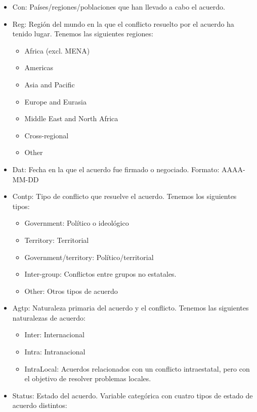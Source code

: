 \documentclass[11pt]{article}
\providecommand{\tightlist}{%
      \setlength{\itemsep}{0pt}\setlength{\parskip}{0pt}}
\begin{document}
\begin{itemize}
\tightlist
\item
  Con: Países/regiones/poblaciones que han llevado a cabo el acuerdo.
\item
  Reg: Región del mundo en la que el conflicto resuelto por el acuerdo
  ha tenido lugar. Tenemos las siguientes regiones:

  \begin{itemize}
  \tightlist
  \item
    Africa (excl. MENA)
  \item
    Americas
  \item
    Asia and Pacific
  \item
    Europe and Eurasia
  \item
    Middle East and North Africa
  \item
    Cross-regional
  \item
    Other
  \end{itemize}
\item
  Dat: Fecha en la que el acuerdo fue firmado o negociado. Formato:
  AAAA-MM-DD
\item
  Contp: Tipo de conflicto que resuelve el acuerdo. Tenemos los
  siguientes tipos:

  \begin{itemize}
  \tightlist
  \item
    Government: Político o ideológico
  \item
    Territory: Territorial
  \item
    Government/territory: Político/territorial
  \item
    Inter-group: Conflictos entre grupos no estatales.
  \item
    Other: Otros tipos de acuerdo
  \end{itemize}
\item
  Agtp: Naturaleza primaria del acuerdo y el conflicto. Tenemos las
  siguientes naturalezas de acuerdo:

  \begin{itemize}
  \item
    Inter: Internacional
  \item
    Intra: Intranacional
  \item
    IntraLocal: Acuerdos relacionados con un conflicto intraestatal,
    pero con el objetivo de resolver problemas locales.
  \end{itemize}
\item
  Status: Estado del acuerdo. Variable categórica con cuatro tipos de estado de
  acuerdo distintos:


\end{itemize}
\end{document}
